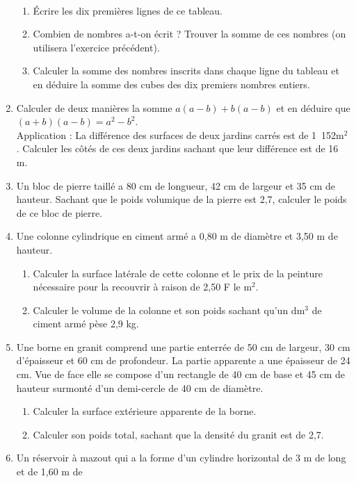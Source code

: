 \documentclass[12 pt]{extarticle}
\theoremstyle{plain}
\begin{document}
\begin{enumerate}
\begin{tabular}{ccc}
\end{tabular}\\
\begin{enumerate}
\item Écrire les dix premières lignes de ce tableau.
\item Combien de nombres a-t-on écrit ? Trouver la 
somme de ces nombres (on utilisera l'exercice précédent). 
\item Calculer la somme des nombres inscrits dans 
chaque ligne du tableau et en déduire la somme des 
cubes des dix premiers nombres entiers.
\end{enumerate}
\item Calculer de deux manières la somme 
$a(a - b) + b(a - b)$ et en déduire que $(a + b)(a 
- b) = a^2 - b^2$. \\
Application : La différence des surfaces de deux 
jardins carrés est de 1~152m${}^2$. Calculer les côtés de 
ces deux jardins sachant que leur différence 
est de 16 m. 
\item Un bloc de pierre taillé a 80 cm de longueur,
42 cm de largeur et 35 cm de hauteur. Sachant que 
le poids volumique de la pierre est 2,7, calculer 
le poids de ce bloc de pierre. 
\item Une colonne cylindrique en ciment armé a 0,80 m 
de diamètre et 3,50 m de hauteur. \begin{enumerate}
\item Calculer la surface latérale de cette colonne 
et le prix de la peinture nécessaire pour la recouvrir 
à raison de 2,50 F le m${}^2$. 
\item Calculer le volume de la colonne et son poids 
sachant qu'un dm${}^3$ de ciment armé pèse 2,9 kg. 
\end{enumerate}
\item Une borne en granit comprend une partie enterrée de 50 cm de largeur, 30 cm d'épaisseur et 60 cm de 
profondeur. La partie apparente a une épaisseur de 24 cm. Vue de face elle se compose d'un rectangle de 40
cm de base et 45 cm de hauteur surmonté d'un demi-cercle de 40 cm de diamètre. \begin{enumerate}
\item Calculer la surface extérieure apparente de 
la borne. 
\item Calculer son poids total, sachant que la densité 
du granit est de 2,7. 
\end{enumerate}
\item Un réservoir à mazout qui a la forme d'un cylindre horizontal de 3 m de long et de 1,60 m de 

\end{enumerate}
\end{document}
